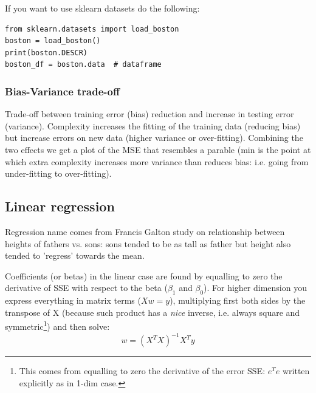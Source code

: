 \documentclass[12pt]{article}
\begin{document}
If you want to use sklearn datasets do the following:
\begin{lstlisting}
from sklearn.datasets import load_boston
boston = load_boston()
print(boston.DESCR)
boston_df = boston.data  # dataframe
\end{lstlisting} 

\subsubsection{Bias-Variance trade-off}
Trade-off between training error (bias) reduction and increase in testing error (variance).
Complexity increases the fitting of the training data (reducing bias) but increase errors on new data (higher variance or over-fitting). Combining the two effects we get a plot of the MSE that resembles a parable (min is the point at which extra complexity increases more variance than reduces bias: i.e. going from under-fitting to over-fitting).

\subsection{Linear regression}
Regression name comes from Francis Galton study on relationship between heights of fathers vs. sons: sons  tended to be as tall as father but height also tended to 'regress' towards the mean.  

Coefficients (or betas) in the linear case are found by equalling to zero the derivative of SSE with respect to the beta ($\beta_1$ and $\beta_0$). For higher dimension you express everything in matrix terms ($X w = y$), multiplying first both sides by the transpose of X (because such product has a \textit{nice} inverse, i.e. always square and symmetric\footnote{This comes from equalling to zero the derivative of the error SSE: $e^T e$ written explicitly as in 1-dim case.}) and then solve:
\[ w = (X^T X)^{-1} X^T y
\]
\end{document}
